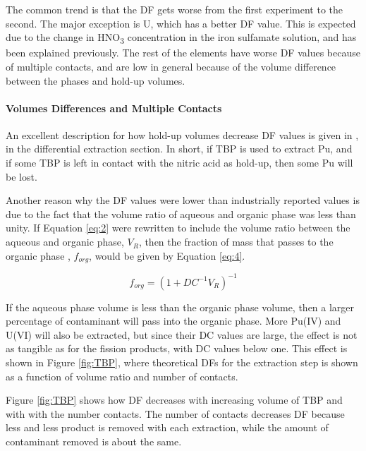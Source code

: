 \documentclass[review]{elsarticle}
\newcommand{\tsbs}{\textsubscript}
\begin{document}
The common trend is that the DF gets worse from the first experiment to the second. The major exception is
U, which has a better DF value. This is expected due to the change in HNO\tsbs{3} concentration 
in the iron sulfamate solution, and has been explained previously. The rest of the elements have worse 
DF values because of multiple contacts, and are low in general
because of the volume difference between the phases and hold-up volumes. 

\paragraph{Volumes Differences and Multiple Contacts}
An excellent description for how hold-up volumes decrease DF values is given in
\cite{long1967}, in the differential extraction section. In short, if TBP is used to extract
Pu, and if some TBP is left in contact with the nitric acid as hold-up, then some Pu will be lost.

Another reason why the DF values were lower than industrially reported values is due to the 
fact that the volume ratio of aqueous and organic phase was less than unity. 
If Equation \ref{eq:2} were rewritten to include the volume ratio between the aqueous
and organic phase, $V_R$, then the fraction of mass that passes to the organic phase
, $f_{org}$, would be given by Equation \ref{eq:4}.

\begin{equation}\label{eq:4}
f_{org}=(1+DC^{-1}V_R)^{-1}
\end{equation}

If the aqueous 
phase volume is less than the organic phase volume, then a larger percentage of contaminant will
pass into the organic phase. More Pu(IV) and U(VI) will also be extracted, but since their DC values
are large, the effect is not as tangible as for the fission products, with DC values below one. 
This effect is shown in Figure \ref{fig:TBP}, where theoretical DFs for the extraction step is shown
as a function of volume ratio and number of contacts.

Figure \ref{fig:TBP} shows how DF decreases with increasing volume of TBP and with with the number
contacts. The number of contacts decreases DF because less and less product is removed with each
extraction, while the amount of contaminant removed is about the same. 
\end{document}
